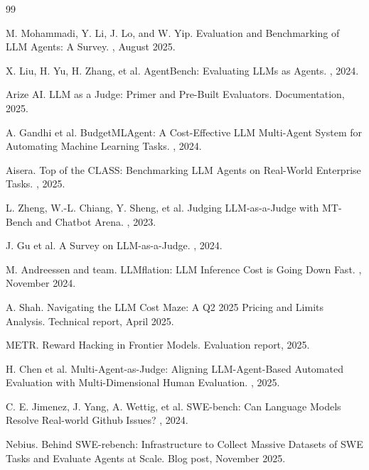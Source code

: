 \documentclass[11pt]{book}
\begin{document}
\begin{thebibliography}{99}

M. Mohammadi, Y. Li, J. Lo, and W. Yip.
\newblock Evaluation and Benchmarking of LLM Agents: A Survey.
, August 2025.

X. Liu, H. Yu, H. Zhang, et al.
\newblock AgentBench: Evaluating LLMs as Agents.
, 2024.

Arize AI.
\newblock LLM as a Judge: Primer and Pre-Built Evaluators.
\newblock Documentation, 2025.

A. Gandhi et al.
\newblock BudgetMLAgent: A Cost-Effective LLM Multi-Agent System for Automating Machine Learning Tasks.
, 2024.

Aisera.
\newblock Top of the CLASS: Benchmarking LLM Agents on Real-World Enterprise Tasks.
, 2025.

L. Zheng, W.-L. Chiang, Y. Sheng, et al.
\newblock Judging LLM-as-a-Judge with MT-Bench and Chatbot Arena.
, 2023.

J. Gu et al.
\newblock A Survey on LLM-as-a-Judge.
, 2024.

M. Andreessen and team.
\newblock LLMflation: LLM Inference Cost is Going Down Fast.
, November 2024.

A. Shah.
\newblock Navigating the LLM Cost Maze: A Q2 2025 Pricing and Limits Analysis.
\newblock Technical report, April 2025.

METR.
\newblock Reward Hacking in Frontier Models.
\newblock Evaluation report, 2025.

H. Chen et al.
\newblock Multi-Agent-as-Judge: Aligning LLM-Agent-Based Automated Evaluation with Multi-Dimensional Human Evaluation.
, 2025.

C. E. Jimenez, J. Yang, A. Wettig, et al.
\newblock SWE-bench: Can Language Models Resolve Real-world Github Issues?
, 2024.

Nebius.
\newblock Behind SWE-rebench: Infrastructure to Collect Massive Datasets of SWE Tasks and Evaluate Agents at Scale.
\newblock Blog post, November 2025.


\end{thebibliography}
\end{document}
